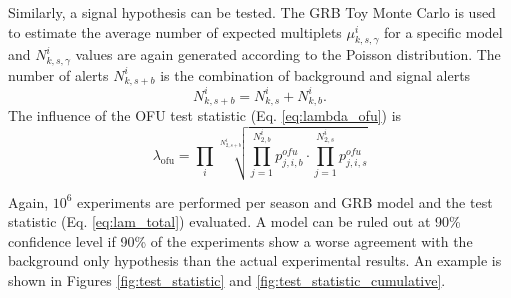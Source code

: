 Similarly, a signal hypothesis can be tested. The GRB Toy Monte Carlo is used 
to estimate the average number of expected multiplets $\mu_{k,s, \gamma}^i$ for 
a 
specific model and $N_{k,s, \gamma}^i$ values are again generated according to 
the 
Poisson  distribution. The number of alerts $N_{k,s+b}^i$ is the
combination of background and signal alerts
\begin{equation}
 N_{k,s+b}^i = N_{k,s}^i + N_{k,b}^i.
\end{equation}
The influence of the OFU test statistic (Eq. \ref{eq:lambda_ofu}) is 
\begin{equation}
 \lambda_\text{ofu} = \prod_i \sqrt[N_{2,s+b}^i]{\prod_{j=1}^{N_{2,b}^i} 
p_{j,i,b}^{ofu} \cdot \prod_{j=1}^{N_{2,s}^i}
p_{j,i,s}^{ofu}}
\end{equation}

Again, $10^6$ experiments are performed per season and GRB 
model and the test statistic (Eq. \ref{eq:lam_total})
evaluated. A model can be ruled 
out at 90\% confidence level if 90\% of the experiments show a worse agreement 
with the background only hypothesis than the actual experimental results.
An example is shown in Figures \ref{fig:test_statistic} and 
\ref{fig:test_statistic_cumulative}.
\begin{figure}[h]
\centering
 \captionsetup{width=.4\textwidth}
\end{figure}

